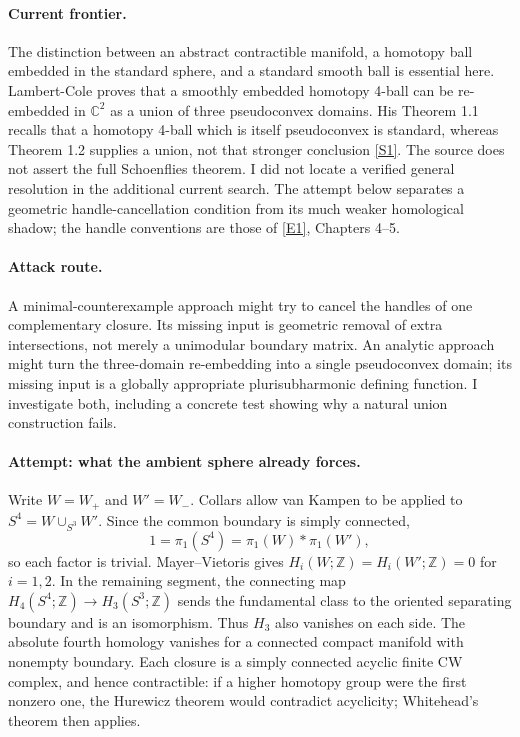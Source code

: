 \documentclass[11pt,a4paper]{article}
\newcommand{\Z}{\mathbb{Z}}
\newcommand{\C}{\mathbb{C}}
\newcommand{\sref}[2]{\hyperlink{source:#1:#2}{[S#2]}}
\newcommand{\eref}[2]{\hyperlink{extra:#1:#2}{[E#2]}}
\numberwithin{equation}{section}
\begin{document}
\paragraph{Current frontier.}
The distinction between an abstract contractible manifold, a homotopy
ball embedded in the standard sphere, and a standard smooth ball is
essential here. Lambert-Cole proves that a smoothly embedded homotopy
4-ball can be re-embedded in $\C^2$ as a union of three pseudoconvex
domains. His Theorem 1.1 recalls that a homotopy 4-ball which is itself
pseudoconvex is standard, whereas Theorem 1.2 supplies a union, not that
stronger conclusion \sref{165}{1}. The source does not assert the full
Schoenflies theorem. I did not locate a verified general resolution in
the additional current search. The attempt below separates a geometric
handle-cancellation condition from its much weaker homological shadow;
the handle conventions are those of \eref{165}{1}, Chapters 4--5.

\paragraph{Attack route.}
A minimal-counterexample approach might try to cancel the handles of
one complementary closure. Its missing input is geometric removal of
extra intersections, not merely a unimodular boundary matrix. An
analytic approach might turn the three-domain re-embedding into a
single pseudoconvex domain; its missing input is a globally appropriate
plurisubharmonic defining function. I investigate both, including a
concrete test showing why a natural union construction fails.

\paragraph{Attempt: what the ambient sphere already forces.}
Write $W=W_+$ and $W'=W_-$. Collars allow van Kampen to be applied to
$S^4=W\cup_{S^3}W'$. Since the common boundary is simply connected,
\begin{equation}
  1=\pi_1(S^4)=\pi_1(W)*\pi_1(W'),
\end{equation}
so each factor is trivial. Mayer--Vietoris gives $H_i(W;\Z)=
H_i(W';\Z)=0$ for $i=1,2$. In the remaining segment, the connecting
map $H_4(S^4;\Z)\to H_3(S^3;\Z)$ sends the fundamental class to the
oriented separating boundary and is an isomorphism. Thus $H_3$ also
vanishes on each side. The absolute fourth homology vanishes for a
connected compact manifold with nonempty boundary. Each closure is a
simply connected acyclic finite CW complex, and hence contractible:
if a higher homotopy group were the first nonzero one, the Hurewicz
theorem would contradict acyclicity; Whitehead's theorem then applies.
\end{document}

